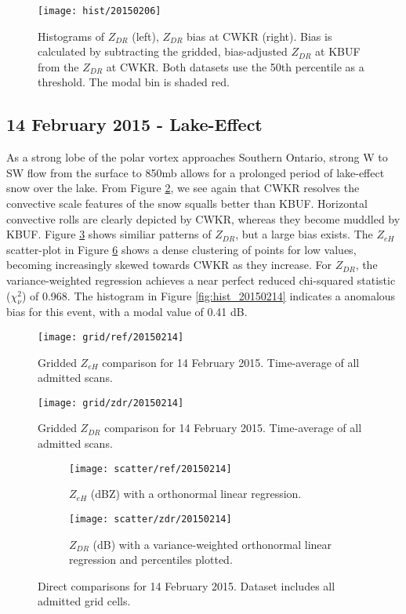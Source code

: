 \begin{figure}[H]
\texttt{[image: hist/20150206]}\centering
\caption{Histograms of $Z_{DR}$ (left), $Z_{DR}$ bias at CWKR (right). Bias is calculated by subtracting the gridded, bias-adjusted $Z_{DR}$ at KBUF from the
$Z_{DR}$ at CWKR. Both datasets use the 50th percentile as a threshold. The modal bin is shaded red.} 
\label{fig:hist_20150206}
\end{figure}

\subsection{14 February 2015 - Lake-Effect}
As a strong lobe of the polar vortex approaches Southern Ontario, strong W to SW flow from the surface to 850mb allows for a prolonged period of lake-effect snow over the lake. From Figure \ref{fig:grid_ref_20150214}, we see again that CWKR resolves the convective scale features of the snow squalls better than KBUF. Horizontal convective rolls are clearly depicted by CWKR, whereas they become muddled by KBUF. Figure \ref{fig:grid_zdr_20150214} shows similiar patterns of $Z_{DR}$, but a large bias exists. The $Z_{eH}$ scatter-plot in Figure \ref{fig:scatter_20150214} shows a dense clustering of points for low values, becoming increasingly skewed towards CWKR as they increase. For $Z_{DR}$, the variance-weighted regression achieves a near perfect reduced chi-squared statistic ($\chi^2_\nu$) of 0.968. The histogram in Figure \ref{fig:hist_20150214} indicates a anomalous bias for this event, with a modal value of 0.41 dB.

\begin{figure}[p]
\texttt{[image: grid/ref/20150214]}
\caption{Gridded $Z_{eH}$ comparison for 14 February 2015. Time-average of all admitted scans.} 
\label{fig:grid_ref_20150214}
\end{figure}

\begin{figure}[p]
\texttt{[image: grid/zdr/20150214]}
\caption{Gridded $Z_{DR}$ comparison for 14 February 2015. Time-average of all admitted scans.} 
\label{fig:grid_zdr_20150214}
\end{figure}

\begin{figure}[p]
\centering
   \begin{subfigure}[t]{0.48\linewidth} \centering
     \texttt{[image: scatter/ref/20150214]}
     \caption{$Z_{eH}$ (dBZ) with a orthonormal linear regression.}\label{fig:scatter_ref_20150214}
   \end{subfigure}
   \begin{subfigure}[t]{0.48\linewidth} \centering
     \texttt{[image: scatter/zdr/20150214]}
     \caption{$Z_{DR}$ (dB) with a variance-weighted orthonormal linear regression and percentiles plotted.}\label{fig:scatter_zdr_20150214}
   \end{subfigure}
\caption{Direct comparisons for 14 February 2015. Dataset includes all admitted grid cells.} \label{fig:scatter_20150214}
\end{figure}

